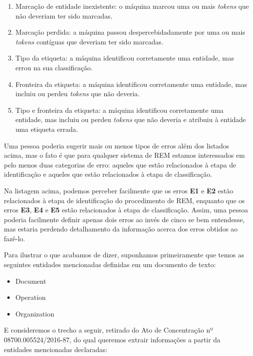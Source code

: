 \documentclass[11pt]{report}
\begin{document}
\begin{enumerate}[label=\textbf{E\arabic*.}]
  \item Marcação de entidade inexistente: o máquina marcou uma ou mais \textit{tokens} que não deveriam ter sido marcadas.
  \item Marcação perdida: a máquina passou despercebidadamente por uma ou mais \textit{tokens} contíguas que deveriam ter sido marcadas.
  \item Tipo da etiqueta: a máquina identificou corretamente uma entidade, mas errou na sua classificação.
  \item Fronteira da etiqueta: a máquina identificou corretamente uma entidade, mas incluiu ou perdeu \textit{tokens} que não deveria.
  \item Tipo e fronteira da etiqueta: a máquina identificou corretamente uma entidade, mas incluiu ou perdeu \textit{tokens} que não deveria e atribuiu à entidade uma etiqueta errada.
\end{enumerate}

Uma pessoa poderia sugerir mais ou menos tipos de erros além
dos listados acima, mas o fato é que para qualquer sistema de REM estamos interessados em pelo menos duas categorias de erro: aqueles que estão relacionados à etapa de identificação
e aqueles que estão relacionados à etapa de classificação.

Na listagem acima, podemos perceber facilmente que os erros \textbf{E1} e \textbf{E2} estão relacionados à etapa de identificação do procedimento de REM, enquanto que
os erros \textbf{E3}, \textbf{E4} e \textbf{E5} estão relacionados à etapa de classificação. Assim, uma pessoa poderia facilmente definir apenas dois erros ao invés
de cinco se bem entendesse, mas estaria perdendo detalhamento da informação acerca dos erros obtidos ao fazê-lo.

Para ilustrar o que acabamos de dizer, suponhamos primeiramente que temos as seguintes entidades mencionadas definidas em um documento de texto:

\begin{itemize}
  \item Document
  \item Operation
  \item Organization
\end{itemize}

E consideremos o trecho a seguir, retirado do Ato de Concentração nº 08700.005524/2016-87, do qual queremos extrair informações a partir da entidades mencionadas
declaradas:
\end{document}
